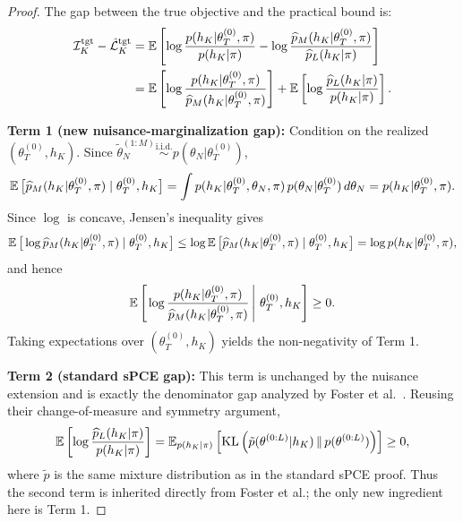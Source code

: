 \begin{proof}
The gap between the true objective and the practical bound is:
\begin{align}
\mathcal{I}_K^{\text{tgt}} - \hat{\mathcal{L}}_K^{\text{tgt}} &= \operatorname{\mathbb{E}}\left[\log \frac{p(h_K|\theta_T^{(0)},\pi)}{p(h_K|\pi)} - \log \frac{\widehat p_M(h_K|\theta_T^{(0)},\pi)}{\widehat p_L(h_K|\pi)}\right] \\
&= \operatorname{\mathbb{E}}\left[\log \frac{p(h_K|\theta_T^{(0)},\pi)}{\widehat p_M(h_K|\theta_T^{(0)},\pi)}\right] + \operatorname{\mathbb{E}}\left[\log \frac{\widehat p_L(h_K|\pi)}{p(h_K|\pi)}\right].
\end{align}

\textbf{Term 1 (new nuisance-marginalization gap):} Condition on the realized $(\theta_T^{(0)}, h_K)$. Since $\tilde{\theta}_N^{(1:M)} \overset{\text{i.i.d.}}{\sim} p(\theta_N|\theta_T^{(0)})$,
\begin{equation}
\operatorname{\mathbb{E}}\big[\widehat p_M(h_K|\theta_T^{(0)},\pi) \mid \theta_T^{(0)}, h_K\big]
= \int p(h_K|\theta_T^{(0)},\theta_N,\pi)\,p(\theta_N|\theta_T^{(0)})\,d\theta_N
= p(h_K|\theta_T^{(0)},\pi).
\end{equation}
Since $\log$ is concave, Jensen's inequality gives
\begin{equation}
\operatorname{\mathbb{E}}\big[\log \widehat p_M(h_K|\theta_T^{(0)},\pi) \mid \theta_T^{(0)}, h_K\big]
\leq \log \operatorname{\mathbb{E}}\big[\widehat p_M(h_K|\theta_T^{(0)},\pi) \mid \theta_T^{(0)}, h_K\big]
= \log p(h_K|\theta_T^{(0)},\pi),
\end{equation}
and hence
\begin{equation}
\operatorname{\mathbb{E}}\left[\left.\log \frac{p(h_K|\theta_T^{(0)},\pi)}{\widehat p_M(h_K|\theta_T^{(0)},\pi)}\,\right|\,\theta_T^{(0)}, h_K\right] \geq 0.
\end{equation}
Taking expectations over $(\theta_T^{(0)}, h_K)$ yields the non-negativity of Term 1.

\textbf{Term 2 (standard sPCE gap):} This term is unchanged by the nuisance extension and is exactly the denominator gap analyzed by Foster et al.~\cite{foster2021}. Reusing their change-of-measure and symmetry argument,
\begin{equation}
\operatorname{\mathbb{E}}\left[\log \frac{\widehat p_L(h_K|\pi)}{p(h_K|\pi)}\right]
= \operatorname{\mathbb{E}}_{p(h_K|\pi)}\left[\text{KL}\left(\tilde{p}(\theta^{(0:L)}|h_K) \,\|\, p(\theta^{(0:L)})\right)\right] \geq 0,
\end{equation}
where $\tilde{p}$ is the same mixture distribution as in the standard sPCE proof. Thus the second term is inherited directly from Foster et al.; the only new ingredient here is Term 1.


\end{proof}
